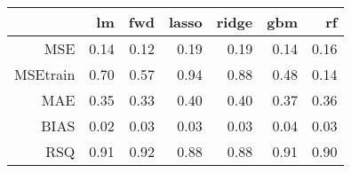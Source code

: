 \begin{table}[ht]
\centering
\begin{tabular}{rrrrrrr}
  \hline
 & lm & fwd & lasso & ridge & gbm & rf \\ 
  \hline
MSE & 0.14 & 0.12 & 0.19 & 0.19 & 0.14 & 0.16 \\ 
  MSEtrain & 0.70 & 0.57 & 0.94 & 0.88 & 0.48 & 0.14 \\ 
  MAE & 0.35 & 0.33 & 0.40 & 0.40 & 0.37 & 0.36 \\ 
  BIAS & 0.02 & 0.03 & 0.03 & 0.03 & 0.04 & 0.03 \\ 
  RSQ & 0.91 & 0.92 & 0.88 & 0.88 & 0.91 & 0.90 \\ 
   \hline
\end{tabular}
\end{table}
